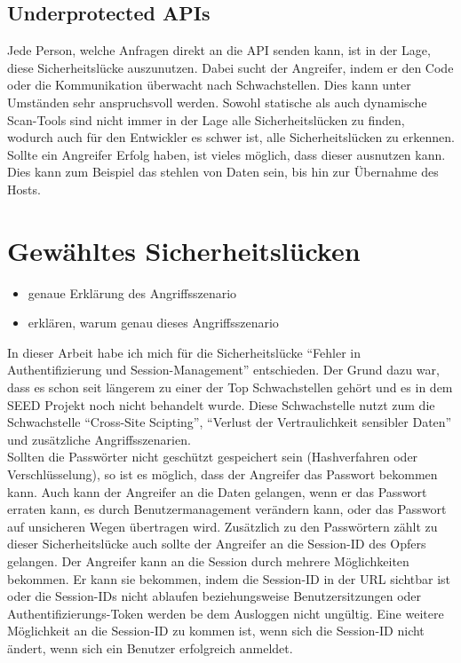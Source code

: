 \subsection{Underprotected APIs}
Jede Person, welche Anfragen direkt an die API senden kann, ist in der Lage, diese Sicherheitslücke auszunutzen. Dabei sucht der Angreifer, indem er den Code oder die Kommunikation überwacht nach Schwachstellen. Dies kann unter Umständen sehr anspruchsvoll werden. Sowohl statische als auch dynamische Scan-Tools sind nicht immer in der Lage alle Sicherheitslücken zu finden, wodurch auch für den Entwickler es schwer ist, alle Sicherheitslücken zu erkennen. Sollte ein Angreifer Erfolg haben, ist vieles möglich, dass dieser ausnutzen kann. Dies kann zum Beispiel das stehlen von Daten sein, bis hin zur Übernahme des Hosts. \\
\section{Gewähltes Sicherheitslücken}
\begin{itemize}
	\item genaue Erklärung des Angriffsszenario
	\item erklären, warum genau dieses Angriffsszenario
\end{itemize}
In dieser Arbeit habe ich mich für die Sicherheitslücke \enquote{Fehler in Authentifizierung und Session-Management} entschieden. Der Grund dazu war, dass es schon seit längerem zu einer der Top Schwachstellen gehört und es in dem SEED Projekt noch nicht behandelt wurde. Diese Schwachstelle nutzt zum die Schwachstelle \enquote{Cross-Site Scipting}, \enquote{Verlust der Vertraulichkeit sensibler Daten} und zusätzliche Angriffsszenarien. \\
Sollten die Passwörter nicht geschützt gespeichert sein (Hashverfahren oder Verschlüsselung), so ist es möglich, dass der Angreifer das Passwort bekommen kann. Auch kann der Angreifer an die Daten gelangen, wenn er das Passwort erraten kann, es durch Benutzermanagement verändern kann, oder das Passwort auf unsicheren Wegen übertragen wird. Zusätzlich zu den Passwörtern zählt zu dieser Sicherheitslücke auch sollte der Angreifer an die Session-ID des Opfers gelangen. Der Angreifer kann an die Session durch mehrere Möglichkeiten bekommen. Er kann sie bekommen, indem die Session-ID in der URL sichtbar ist oder die Session-IDs nicht ablaufen beziehungsweise Benutzersitzungen oder Authentifizierungs-Token werden be dem Ausloggen nicht ungültig. Eine weitere Möglichkeit an die Session-ID zu kommen ist, wenn sich die Session-ID nicht ändert, wenn sich ein Benutzer erfolgreich anmeldet. \\
